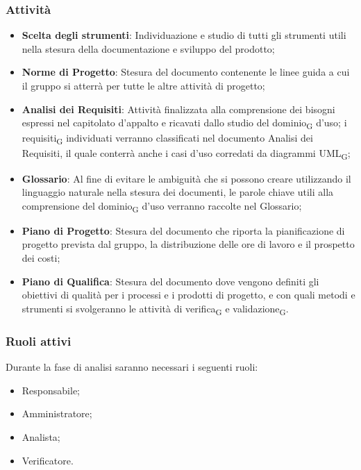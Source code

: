 \subsubsection{Attività}\:
\begin{itemize}
	\item \textbf{Scelta degli strumenti}: Individuazione e studio di tutti gli strumenti utili nella stesura della documentazione e sviluppo del prodotto;
    \item \textbf{Norme di Progetto}: Stesura del documento contenente le linee guida a cui il gruppo si atterrà per tutte le altre attività di progetto;
    \item \textbf{Analisi dei Requisiti}: Attività finalizzata alla comprensione dei bisogni espressi nel capitolato d’appalto e ricavati dallo studio del dominio\textsubscript{G} d’uso; i requisiti\textsubscript{G} individuati verranno classificati nel documento Analisi dei Requisiti, il quale conterrà anche i casi d’uso corredati da diagrammi UML\textsubscript{G};
    \item \textbf{Glossario}: Al fine di evitare le ambiguità che si possono creare utilizzando il linguaggio naturale nella stesura dei documenti, le parole chiave utili alla comprensione del dominio\textsubscript{G} d’uso verranno raccolte nel Glossario;
    \item \textbf{Piano di Progetto}: Stesura del documento che riporta la pianificazione di progetto prevista dal gruppo, la distribuzione delle ore di lavoro e il prospetto dei costi;
    \item \textbf{Piano di Qualifica}: Stesura del documento dove vengono definiti gli obiettivi di qualità per i processi e i prodotti di progetto, e con quali metodi e strumenti si svolgeranno le attività di verifica\textsubscript{G} e validazione\textsubscript{G}.
\end{itemize}

\subsubsection{Ruoli attivi}
Durante la fase di analisi saranno necessari i seguenti ruoli:
\begin{itemize}
	\item Responsabile;
    \item Amministratore;
    \item Analista;
    \item Verificatore.
\end{itemize}


